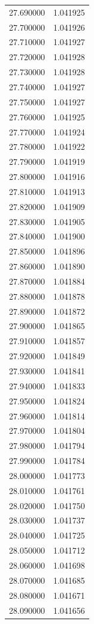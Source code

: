 \begin{tabular}{rr}
27.690000 & 1.041925 \\
27.700000 & 1.041926 \\
27.710000 & 1.041927 \\
27.720000 & 1.041928 \\
27.730000 & 1.041928 \\
27.740000 & 1.041927 \\
27.750000 & 1.041927 \\
27.760000 & 1.041925 \\
27.770000 & 1.041924 \\
27.780000 & 1.041922 \\
27.790000 & 1.041919 \\
27.800000 & 1.041916 \\
27.810000 & 1.041913 \\
27.820000 & 1.041909 \\
27.830000 & 1.041905 \\
27.840000 & 1.041900 \\
27.850000 & 1.041896 \\
27.860000 & 1.041890 \\
27.870000 & 1.041884 \\
27.880000 & 1.041878 \\
27.890000 & 1.041872 \\
27.900000 & 1.041865 \\
27.910000 & 1.041857 \\
27.920000 & 1.041849 \\
27.930000 & 1.041841 \\
27.940000 & 1.041833 \\
27.950000 & 1.041824 \\
27.960000 & 1.041814 \\
27.970000 & 1.041804 \\
27.980000 & 1.041794 \\
27.990000 & 1.041784 \\
28.000000 & 1.041773 \\
28.010000 & 1.041761 \\
28.020000 & 1.041750 \\
28.030000 & 1.041737 \\
28.040000 & 1.041725 \\
28.050000 & 1.041712 \\
28.060000 & 1.041698 \\
28.070000 & 1.041685 \\
28.080000 & 1.041671 \\
28.090000 & 1.041656 \\

\end{tabular}
